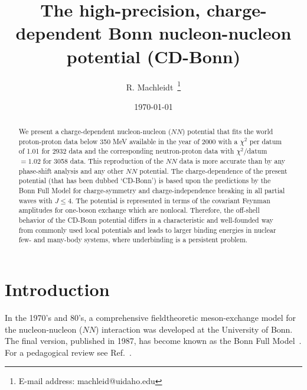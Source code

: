 \tighten

\draft
\title{The high-precision, charge-dependent Bonn nucleon-nucleon
potential (CD-Bonn)}
\author{R. Machleidt~\footnote{E-mail address: machleid@uidaho.edu}}
\address{Department of Physics, University of Idaho, Moscow,
Idaho 83844, U. S. A.}

\date{\today}


\maketitle


\tableofcontents

\newpage


\begin{abstract}
We present a charge-dependent nucleon-nucleon ($NN$) potential
that fits the world proton-proton data below 350 MeV available in the
year of 2000 with a $\chi^2$ per datum of 1.01 for 2932 data 
and the corresponding neutron-proton data 
with $\chi^2$/datum $= 1.02$ for 3058 data. 
This reproduction of the $NN$ data is more accurate than by any
phase-shift analysis and any other $NN$ potential. 
The charge-dependence of the present potential (that has been dubbed
`CD-Bonn') is based upon the predictions by the Bonn Full Model
for charge-symmetry and charge-independence breaking in all partial
waves with $J\leq 4$. 
The potential is represented in terms of the covariant
Feynman amplitudes for one-boson exchange which are nonlocal.
Therefore, the off-shell behavior of the CD-Bonn potential
differs in a characteristic and well-founded way from 
commonly used local potentials and leads to larger binding
energies in nuclear few- and many-body systems, where underbinding
is a persistent problem.
\end{abstract}


\newpage



\section{Introduction}

In the 1970's and 80's,
a comprehensive fieldtheoretic meson-exchange model for the 
nucleon-nucleon ($NN$) interaction was developed at the 
University of Bonn. 
The final version, published in 1987,
has become known as the Bonn Full Model~\cite{MHE87}.
For a pedagogical review see Ref.~\cite{Mac89}.

